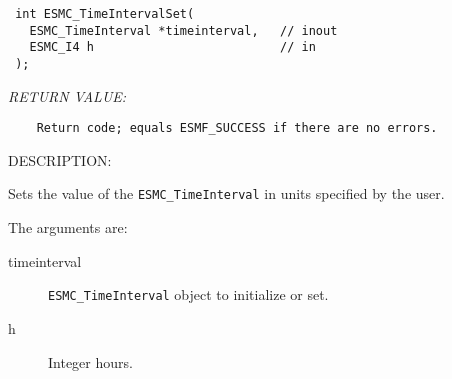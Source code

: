   
\begin{verbatim} int ESMC_TimeIntervalSet(
   ESMC_TimeInterval *timeinterval,   // inout
   ESMC_I4 h                          // in
 );
 \end{verbatim}{\em RETURN VALUE:}
\begin{verbatim}    Return code; equals ESMF_SUCCESS if there are no errors.\end{verbatim}
{\sf DESCRIPTION:\\ }


  
    Sets the value of the {\tt ESMC\_TimeInterval} in units specified by
    the user.
  
    The arguments are:
    \begin{description}
    \item[timeinterval]
      {\tt ESMC\_TimeInterval} object to initialize or set.
    \item[h]
      Integer hours.
    \end{description}
  
\setlength{\parskip}{\oldparskip}
\setlength{\parindent}{\oldparindent}
\setlength{\baselineskip}{\oldbaselineskip}
